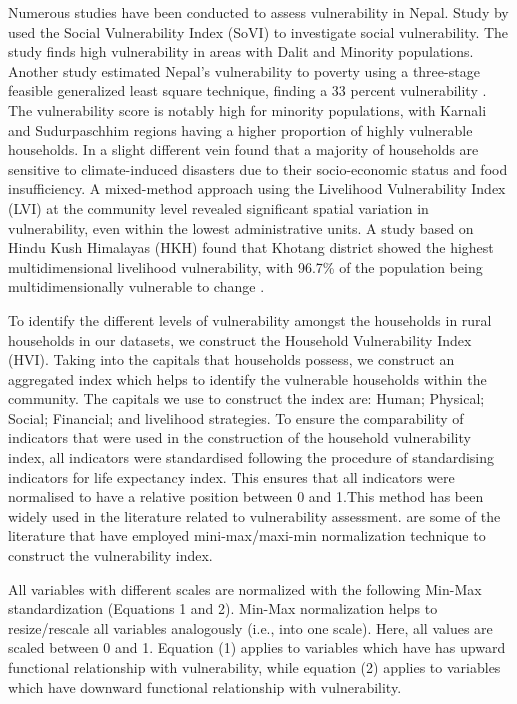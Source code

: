 Numerous studies have been conducted to assess vulnerability in Nepal. Study by \cite{aksha2019analysis} used the Social Vulnerability Index (SoVI) to investigate social vulnerability. The study finds high vulnerability in areas with Dalit and Minority populations. Another study estimated Nepal's vulnerability to poverty using a three-stage feasible generalized least square technique, finding a 33 percent vulnerability \citep{shahiestimating}. The vulnerability score is notably high for minority populations, with Karnali and Sudurpaschhim regions having a higher proportion of highly vulnerable households. In a slight different vein \cite{bista2019grasping} found that a majority of households are sensitive to climate-induced disasters due to their socio-economic status and food insufficiency. A mixed-method approach using the Livelihood Vulnerability Index (LVI) at the community level revealed significant spatial variation in vulnerability, even within the lowest administrative units. A study based on Hindu Kush Himalayas (HKH) found that Khotang district showed the highest multidimensional livelihood vulnerability, with 96.7\% of the population being multidimensionally vulnerable to change \citep{gerlitz2017multidimensional}.

To identify the different levels of vulnerability amongst the households in rural households in our datasets, we construct the Household Vulnerability Index (HVI). Taking into the capitals that households possess, we construct an aggregated index which helps to identify the vulnerable households within the community. The capitals we use to construct the index are: Human; Physical; Social; Financial; and livelihood strategies. To ensure the comparability of indicators that were used in the construction of the household vulnerability index, all indicators were standardised following the \citep{watkins2007human} procedure of standardising indicators for life expectancy index. This ensures that all indicators were normalised to have a relative position between 0 and 1.This method has been widely used in the literature related to vulnerability assessment. \cite{fang2016rural, antwi2013characterising, karunarathne2020developing, huynh2018multi, dumenu2020social} are some of the literature that have employed mini-max/maxi-min normalization technique to construct the vulnerability index.\par

All variables with different scales are normalized with the following Min-Max standardization 
(Equations 1 and 2). Min-Max normalization helps to resize/rescale all variables analogously 
(i.e., into one scale). Here, all values are scaled between 0 and 1. Equation (1) applies to 
variables which have has upward functional relationship with vulnerability, while equation (2) applies to variables which have downward functional relationship with vulnerability.\par  

